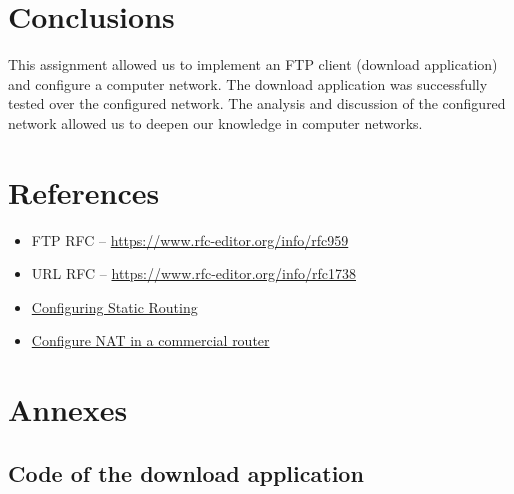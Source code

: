 \documentclass[a4paper,11pt,english]{article}
\begin{document}
\section{Conclusions}
    This assignment allowed us to implement an FTP client (download application) and configure a computer network.
    The download application was successfully tested over the configured network.
    The analysis and discussion of the configured network allowed us to deepen our knowledge in computer networks.


\section{References}
\begin{itemize}
    \item FTP RFC -- \href{https://www.rfc-editor.org/info/rfc959}{https://www.rfc-editor.org/info/rfc959}
    \item URL RFC -- \href{https://www.rfc-editor.org/info/rfc1738}{https://www.rfc-editor.org/info/rfc1738}
    \item \href{https://www.cisco.com/c/en/us/td/docs/switches/datacenter/nexus6000/sw/unicast/7_x/cisco_n6k_layer3_ucast_cfg_rel_x/l3_route.pdf}{Configuring Static Routing}
    \item \href{https://www.cisco.com/c/en/us/td/docs/ios-xml/ios/ipaddr_nat/configuration/xe-16/nat-xe-16-book/iadnat-addr-consv.html}{Configure NAT in a commercial router}
\end{itemize}


\newpage
\section{Annexes}
    \subsection{Code of the download application}

        
        
        
        
        
        
        
        
\end{document}
